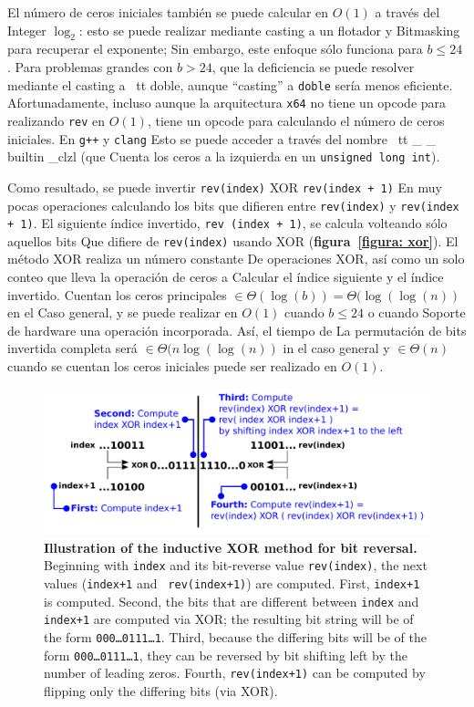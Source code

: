 ﻿\documentclass[10pt]{article}
\begin{document}
El número de ceros iniciales también se puede calcular en $O(1)$ a través del
Integer $\log_2$: esto se puede realizar mediante casting a un flotador y
Bitmasking para recuperar el exponente; Sin embargo, este enfoque sólo funciona para $b \leq 24$ \cite{anderson: bit}. Para problemas grandes con $b>24$, que la deficiencia se puede resolver mediante el casting a {\ tt doble}, aunque “casting” a {\tt doble} sería menos eficiente. Afortunadamente, incluso aunque la arquitectura {\tt x64} no tiene un opcode para realizando {\tt rev} en $O(1)$, tiene un opcode para calculando el número de ceros iniciales. En {\tt g++} y {\tt clang}
Esto se puede acceder a través del nombre {\ tt \_ \_ builtin \_clzl} (que
Cuenta los ceros a la izquierda en un {\tt unsigned long int}).

Como resultado, se puede invertir {\tt rev(index)} XOR {\tt rev(index + 1)}
En muy pocas operaciones calculando los bits que difieren entre {\tt rev(index)} y {\tt rev(index + 1)}. El siguiente índice invertido, {\tt rev (index + 1)}, se calcula volteando sólo aquellos bits
Que difiere de {\tt rev(index)} usando XOR ({\bf figura~\ref{figura: xor}}). El método XOR realiza un número constante
De operaciones XOR, así como un solo conteo que lleva la operación de ceros a
Calcular el índice siguiente y el índice invertido. Cuentan los ceros principales
$\in \Theta(\log(b)) = \Theta(\log(\log(n))$ en el
Caso general, y se puede realizar en $O(1)$ cuando $b \leq 24$ o cuando
Soporte de hardware una operación incorporada. Así, el tiempo de
La permutación de bits invertida completa será $\in \Theta(n \log(\log(n))$ in el caso general y $\in \Theta(n)$ cuando se cuentan los ceros iniciales puede ser realizado en $O(1)$.

\begin{figure}
\centering
\includegraphics[width=6in]{cartoons/xor.pdf}
\caption{{\bf Illustration of the inductive XOR method for bit
    reversal.} Beginning with {\tt index} and its bit-reverse value
  {\tt rev(index)}, the next values ({\tt index+1} and {\tt
    rev(index+1)}) are computed. First, {\tt index+1} is
  computed. Second, the bits that are different between {\tt index}
  and {\tt index+1} are computed via XOR; the resulting bit string
  will be of the form {\tt 000\ldots 0111\ldots 1}. Third, because the
  differing bits will be of the form {\tt 000\ldots 0111\ldots 1},
  they can be reversed by bit shifting left by the number of leading
  zeros. Fourth, {\tt rev(index+1)} can be computed by flipping only
  the differing bits (via XOR). 
  \label{figure:xor}}
\end{figure}
\end{document}
